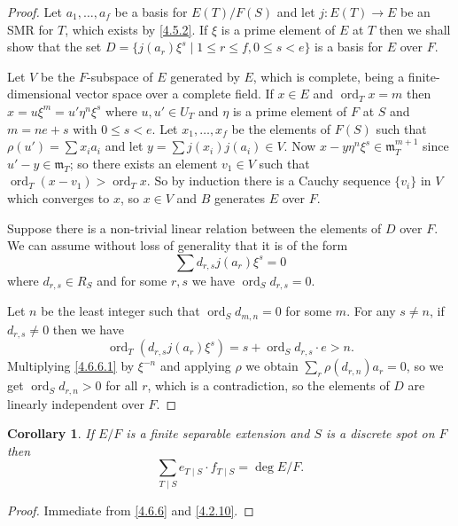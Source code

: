 \documentclass[10pt,leqno]{article}
\newtheorem{coro}[theo]{Corollary}
\theoremstyle{definition}
\def\mm{\mathfrak{m}}
\DeclareMathOperator{\ord}{ord}
\begin{document}
\begin{proof}
Let $a_1, \ldots, a_f$ be a basis for $E(T)/F(S)$ and let $j : E(T) \to E$ be an SMR for $T$, which exists by \ref{4.5.2}.
If $\xi$ is a prime element of $E$ at $T$ then we shall show that the set $D = \{ j(a_r) \xi^s \mid 1 \leq r \leq f, 0 \leq s < e\}$ is a basis for $E$ over $F$.

Let $V$ be the $F$-subspace of $E$ generated by $E$, which is complete, being a finite-dimensional vector space over a complete field.
If $x \in E$ and $\ord_T x = m$ then $x = u\xi^m = u' \eta^n \xi^s$ where $u,u' \in U_T$ and $\eta$ is a prime element of $F$ at $S$ and $m = ne + s$ with $0 \leq s < e$.
Let $x_1, \ldots, x_f$ be the elements of $F(S)$ such that $\rho(u') = \sum x_i a_i$ and let $y = \sum j(x_i) j(a_i) \in V$.
Now $x  -y \eta^n \xi^s \in \mm_T^{m+1}$ since $u' - y \in \mm_T$; so there exists an element $v_1 \in V$ such that $\ord_T(x - v_1) > \ord_T x$.
So by induction there is a Cauchy sequence $\{v_i\}$ in $V$ which converges to $x$, so $x \in V$ and $B$ generates $E$ over $F$.

Suppose there is a non-trivial linear relation between the elements of $D$ over $F$.
We can assume without loss of generality that it is of the form
\begin{equation}
\label{4.6.6.1}
\sum d_{r,s} j(a_r) \xi^s = 0
\end{equation}
where $d_{r,s} \in R_S$ and for some $r,s$ we have $\ord_S d_{r,s} = 0$.

Let $n$ be the least integer such that $\ord_S d_{m,n} = 0$ for some $m$.
For any $s \not= n$, if $d_{r,s} \not= 0$ then we have
\begin{equation}
\label{4.6.6.2}
\ord_T( d_{r,s} j(a_r) \xi^s ) = s + \ord_S d_{r,s} \cdot e > n.
\end{equation}
Multiplying \eqref{4.6.6.1} by $\xi^{-n}$ and applying $\rho$ we obtain $\sum_r \rho(d_{r,n}) a_r = 0$, so we get $\ord_S d_{r,n} > 0$ for all $r$, which is a contradiction, so the elements of $D$ are linearly independent over $F$.
\end{proof}


\begin{coro}
\label{4.6.7}
If $E/F$ is a finite separable extension and $S$ is a discrete spot on $F$ then
\[
\sum_{T \mid S} e_{T \mid S} \cdot f_{T \mid S} = \deg E/F.
\]
\end{coro}

\begin{proof}
Immediate from \ref{4.6.6} and \ref{4.2.10}.
\end{proof}
\end{document}

